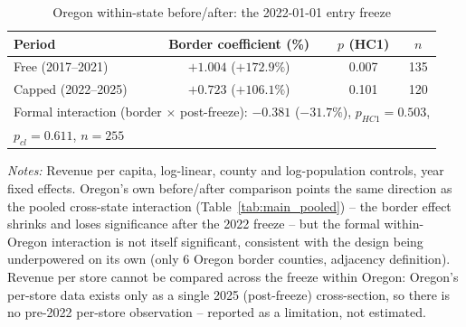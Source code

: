 \begin{table}[htbp]
\centering
\caption{Oregon within-state before/after: the 2022-01-01 entry freeze}
\label{tab:oregon_beforeafter}
\small
\begin{tabular}{lccc}
\toprule
Period & Border coefficient (\%) & $p$ (HC1) & $n$ \\
\midrule
Free (2017--2021) & $+1.004$ ($+172.9\%$) & 0.007 & 135 \\
Capped (2022--2025) & $+0.723$ ($+106.1\%$) & 0.101 & 120 \\
\midrule
\multicolumn{4}{l}{Formal interaction (border $\times$ post-freeze): $-0.381$ ($-31.7\%$), $p_{HC1}=0.503$,} \\
\multicolumn{4}{l}{$p_{cl}=0.611$, $n=255$} \\
\bottomrule
\end{tabular}
\begin{minipage}{0.85\textwidth}
\vspace{0.3em}
\footnotesize
\textit{Notes:} Revenue per capita, log-linear, county and log-population controls, year fixed effects.
Oregon's own before/after comparison points the same direction as the pooled cross-state interaction
(Table~\ref{tab:main_pooled}) -- the border effect shrinks and loses significance after the 2022 freeze --
but the formal within-Oregon interaction is not itself significant, consistent with the design being
underpowered on its own (only 6 Oregon border counties, adjacency definition). Revenue per store cannot be compared across the
freeze within Oregon: Oregon's per-store data exists only as a single 2025 (post-freeze) cross-section, so
there is no pre-2022 per-store observation -- reported as a limitation, not estimated.
\end{minipage}
\end{table}
